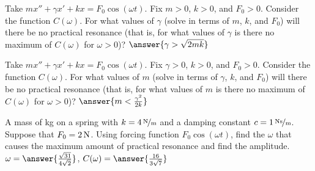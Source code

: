 \documentclass{ximera}
\begin{document}

\begin{exercise}
    Take $m x'' + \gamma x' + kx = F_0 \cos (\omega t)$. Fix $m > 0$, $k > 0$, and $F_0 > 0$.  Consider the function $C(\omega)$. For what values of $\gamma$ (solve in terms of $m$, $k$, and $F_0$) will there be no practical resonance (that is, for what values of $\gamma$ is there no maximum of $C(\omega)$ for $\omega > 0$)? $\answer{\gamma > \sqrt{2mk}}$
\end{exercise}

\begin{exercise}
    Take $m x'' + \gamma x' + kx = F_0 \cos (\omega t)$. Fix $\gamma > 0$, $k > 0$, and $F_0 > 0$.  Consider the function $C(\omega)$. For what values of $m$ (solve in terms of $\gamma$, $k$, and $F_0$) will there be no practical resonance (that is, for what values of $m$ is there no maximum of $C(\omega)$ for $\omega > 0$)? $\answer{m < \frac{\gamma^2}{2k}}$
\end{exercise}

\begin{exercise}%
    A mass of \unit[4]{kg} on a spring with $k=\unitfrac[4]{N}{m}$ and a damping constant $c=\unitfrac[1]{Ns}{m}$. Suppose that $F_0 = \unit[2]{N}$.  Using forcing function $F_0 \cos (\omega t)$, find the $\omega$ that causes the maximum amount of practical resonance and find the amplitude. $\omega = \answer{\frac{\sqrt{31}}{4\sqrt{2}}}$, $C(\omega) = \answer{\frac{16}{3\sqrt{7}}}$
\end{exercise}
\end{document}

